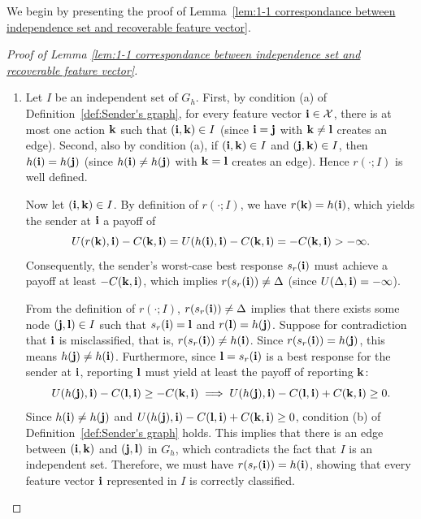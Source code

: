 We begin by presenting the proof of Lemma~\ref{lem:1-1 correspondance between independence set and recoverable feature vector}.

\begin{proof}[Proof of Lemma \ref{lem:1-1 correspondance between independence set and recoverable feature vector}]\label{proof:lem independence set}
	\begin{enumerate}[label=(\alph*)]
		\item Let $I$ be an independent set of $G_h$. First, by condition (a) of Definition~\ref{def:Sender's graph}, for every feature vector $\mathbf{i} \in \mathcal{X}$, there is at most one action $\mathbf{k}$ such that $(\mathbf{i},\mathbf{k}) \in I$ (since $\mathbf{i} = \mathbf{j}$ with $\mathbf{k} \neq \mathbf{l}$ creates an edge). Second, also by condition (a), if $(\mathbf{i},\mathbf{k}) \in I$ and $(\mathbf{j},\mathbf{k}) \in I$, then $h(\mathbf{i}) = h(\mathbf{j})$ (since $h(\mathbf{i}) \neq h(\mathbf{j})$ with $\mathbf{k} = \mathbf{l}$ creates an edge). Hence $r(\cdot;I)$ is well defined.

		Now let $(\mathbf{i},\mathbf{k}) \in I$. By definition of $r(\cdot;I)$, we have $r(\mathbf{k}) = h(\mathbf{i})$, which yields the sender at $\mathbf{i}$ a payoff of
		\begin{equation*}
			U(r(\mathbf{k}),\mathbf{i}) - C(\mathbf{k},\mathbf{i}) = U(h(\mathbf{i}),\mathbf{i}) - C(\mathbf{k},\mathbf{i}) = -C(\mathbf{k},\mathbf{i}) > -\infty.
		\end{equation*}
		Consequently, the sender's worst-case best response $s_r(\mathbf{i})$ must achieve a payoff at least $-C(\mathbf{k},\mathbf{i})$, which implies $r(s_r(\mathbf{i})) \neq \Delta$ (since $U(\Delta,\mathbf{i}) = -\infty$).
		
		From the definition of $r(\cdot;I)$, $r(s_r(\mathbf{i})) \neq \Delta$ implies that there exists some node $(\mathbf{j},\mathbf{l}) \in I$ such that $s_r(\mathbf{i}) = \mathbf{l}$ and $r(\mathbf{l}) = h(\mathbf{j})$. Suppose for contradiction that $\mathbf{i}$ is misclassified, that is, $r(s_r(\mathbf{i})) \neq h(\mathbf{i})$. Since $r(s_r(\mathbf{i})) = h(\mathbf{j})$, this means $h(\mathbf{j}) \neq h(\mathbf{i})$. Furthermore, since $\mathbf{l} = s_r(\mathbf{i})$ is a best response for the sender at $\mathbf{i}$, reporting $\mathbf{l}$ must yield at least the payoff of reporting $\mathbf{k}$:
		\begin{equation*}
			U(h(\mathbf{j}),\mathbf{i}) - C(\mathbf{l},\mathbf{i}) \geq -C(\mathbf{k},\mathbf{i}) \implies U(h(\mathbf{j}),\mathbf{i}) - C(\mathbf{l},\mathbf{i}) + C(\mathbf{k},\mathbf{i}) \geq 0.
		\end{equation*}
		Since $h(\mathbf{i}) \neq h(\mathbf{j})$ and $U(h(\mathbf{j}),\mathbf{i}) - C(\mathbf{l},\mathbf{i}) + C(\mathbf{k},\mathbf{i}) \geq 0$, condition (b) of Definition~\ref{def:Sender's graph} holds. This implies that there is an edge between $(\mathbf{i},\mathbf{k})$ and $(\mathbf{j},\mathbf{l})$ in $G_h$, which contradicts the fact that $I$ is an independent set. Therefore, we must have $r(s_r(\mathbf{i})) = h(\mathbf{i})$, showing that every feature vector $\mathbf{i}$ represented in $I$ is correctly classified.
		

\end{enumerate}
\end{proof}
